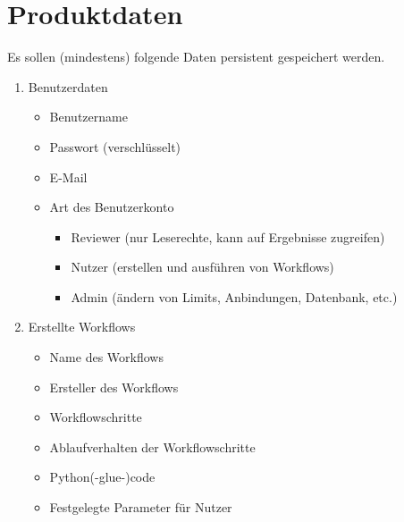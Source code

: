 \chapter{Produktdaten}
Es sollen (mindestens) folgende Daten persistent gespeichert werden.

\renewcommand{\labelenumi}{/PD\arabic{enumi}0/}
 \begin{enumerate}
    \item Benutzerdaten
    \begin{itemize}
        \setlength\itemsep{-1em}
        \item Benutzername
        \item Passwort (verschlüsselt)
        \item E-Mail
        \item Art des Benutzerkonto
        \begin{itemize}
            \setlength\itemsep{-1em}
            \item \gls{Reviewer} (nur Leserechte, kann auf Ergebnisse zugreifen)
            \item \gls{Nutzer} (erstellen und ausführen von Workflows)
            \item \gls{Admin} (ändern von Limits, Anbindungen, Datenbank, etc.)
        \end{itemize}
    \end{itemize}
    
    \item Erstellte Workflows
    \begin{itemize}
        \setlength\itemsep{-1em}
        \item Name des Workflows
        \item Ersteller des Workflows
        \item Workflowschritte
        \item Ablaufverhalten der Workflowschritte
        \item Python(-glue-)code
        \item Festgelegte Parameter für Nutzer
    \end{itemize}
    

\end{enumerate}
